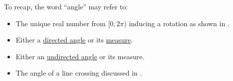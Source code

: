\begin{remark}\label{rem:angle}
  To recap, the word \enquote{angle} may refer to:
  \begin{itemize}
    \item The unique real number from \( [0, 2\pi) \) inducing a rotation as shown in .
    \item Either a \hyperref[def:angle]{directed angle} or its \hyperref[def:angle/measure]{measure}.
    \item Either an \hyperref[def:angle]{undirected angle} or its measure.
    \item The angle of a line crossing discussed in .
  \end{itemize}
\end{remark}

